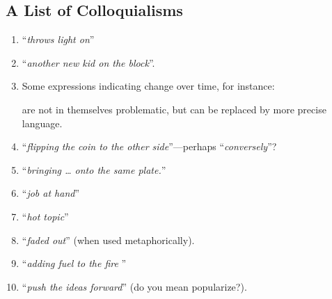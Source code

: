 \begin{scope}
\section{A List of Colloquialisms}\label{sec:list-colloquialisms}
\begin{enumerate}
\item
  ``\textit{throws light on}''
\item
  ``\textit{another new kid on the block}''.
\item
  Some expressions indicating change over time, for instance:
  are not in themselves problematic, but can be replaced by
  more precise language.
\item
  ``\textit{flipping the coin to the other side}''---perhaps ``\textsl{conversely}''? 
\item 
  ``\textit{bringing \dots{} onto the same plate.}''
\item
  ``\textit{job at hand}''
\item
  ``\textit{hot topic}''
\item
  ``\textit{faded out}''  (when used metaphorically).
\item
  ``\textit{adding fuel to the fire }''
\item
  ``\textit{push the ideas forward}'' (do you mean popularize?).
\end{enumerate}

\end{scope}
